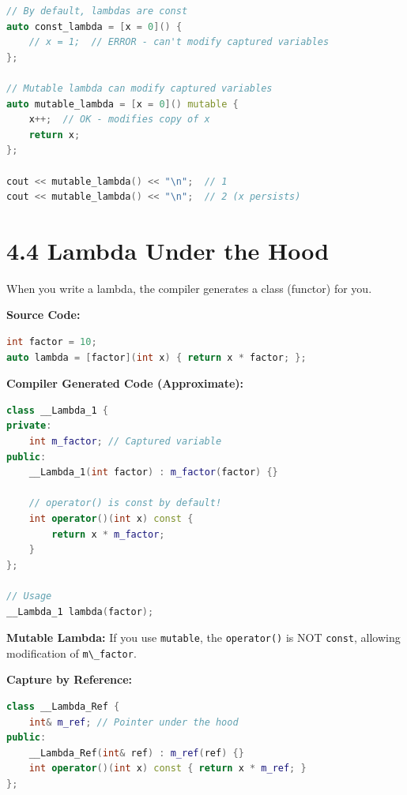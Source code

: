 \begin{lstlisting}[language={C++}]
// By default, lambdas are const
auto const_lambda = [x = 0]() {
    // x = 1;  // ERROR - can't modify captured variables
};

// Mutable lambda can modify captured variables
auto mutable_lambda = [x = 0]() mutable {
    x++;  // OK - modifies copy of x
    return x;
};

cout << mutable_lambda() << "\n";  // 1
cout << mutable_lambda() << "\n";  // 2 (x persists)
\end{lstlisting}

\hypertarget{lambda-under-the-hood}{%
\section{4.4 Lambda Under the Hood}\label{lambda-under-the-hood}}

When you write a lambda, the compiler generates a class (functor) for
you.

\textbf{Source Code:}

\begin{lstlisting}[language={C++}]
int factor = 10;
auto lambda = [factor](int x) { return x * factor; };
\end{lstlisting}

\textbf{Compiler Generated Code (Approximate):}

\begin{lstlisting}[language={C++}]
class __Lambda_1 {
private:
    int m_factor; // Captured variable
public:
    __Lambda_1(int factor) : m_factor(factor) {}
    
    // operator() is const by default!
    int operator()(int x) const {
        return x * m_factor;
    }
};

// Usage
__Lambda_1 lambda(factor);
\end{lstlisting}

\textbf{Mutable Lambda:} If you use \passthrough{\lstinline!mutable!},
the \passthrough{\lstinline!operator()!} is NOT
\passthrough{\lstinline!const!}, allowing modification of
\passthrough{\lstinline!m\_factor!}.

\textbf{Capture by Reference:}

\begin{lstlisting}[language={C++}]
class __Lambda_Ref {
    int& m_ref; // Pointer under the hood
public:
    __Lambda_Ref(int& ref) : m_ref(ref) {}
    int operator()(int x) const { return x * m_ref; }
};
\end{lstlisting}

